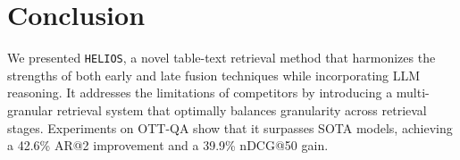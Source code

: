 \vspace{-1mm}
\section{Conclusion}
\label{sec:conclusion}
\vspace{-1mm}


We presented \texttt{HELIOS}, a novel table-text retrieval method that harmonizes the strengths of both early and late fusion techniques while incorporating LLM reasoning. 
It addresses the limitations of competitors by introducing a multi-granular retrieval system that optimally balances granularity across retrieval stages. 
Experiments on OTT-QA show that it surpasses SOTA models, achieving a 42.6\% AR@2 improvement and a 39.9\% nDCG@50 gain.








